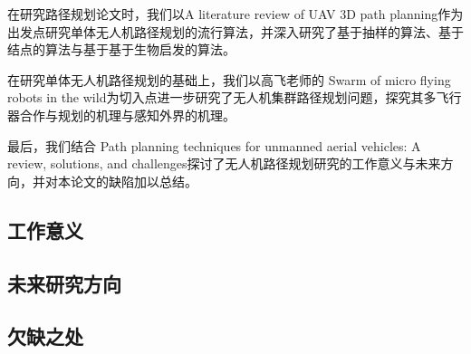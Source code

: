 \documentclass[conference]{IEEEtran}
\begin{document}
在研究路径规划论文时，我们以A literature review of UAV 3D path planning\cite{无人机路径规划综述}作为出发点研究单体无人机路径规划的流行算法，并深入研究了基于抽样的算法、基于结点的算法与基于基于生物启发的算法。

在研究单体无人机路径规划的基础上，我们以高飞老师的 Swarm of micro flying robots in the wild\cite{集群路径规划}为切入点进一步研究了无人机集群路径规划问题，探究其多飞行器合作与规划的机理与感知外界的机理。

最后，我们结合 Path planning techniques for unmanned aerial vehicles: A review, solutions, and challenges\cite{未来研究方向}探讨了无人机路径规划研究的工作意义与未来方向，并对本论文的缺陷加以总结。


\subsection{工作意义}%



\subsection{未来研究方向}%



\subsection{欠缺之处}%




\end{document}
